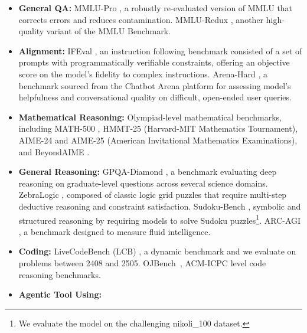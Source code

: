 \begin{itemize}
    \item\textbf{General QA: }MMLU-Pro \citep{wang2024mmluprorobustchallengingmultitask}, a robustly re-evaluated version of MMLU \citep{hendrycks2021measuringmassivemultitasklanguage} that corrects errors and reduces contamination. MMLU-Redux \citep{gema2025mmluredux}, another high-quality variant of the MMLU Benchmark. 
    \item\textbf{Alignment: }IFEval \citep{zhou2023ifeval}, an instruction following benchmark consisted of a set of prompts with programmatically verifiable constraints, offering an objective score on the model's fidelity to complex instructions. Arena-Hard \citep{arenahard2024}, a benchmark sourced from the Chatbot Arena platform for assessing model's helpfulness and conversational quality on difficult, open-ended user queries. 
    \item\textbf{Mathematical Reasoning: }Olympiad-level mathematical benchmarks, including MATH-500 \citep{math500}, HMMT-25\citep{HMMT25} (Harvard-MIT Mathematics Tournament), AIME-24 \citep{AIME24} and AIME-25 \citep{AIME25} (American Invitational Mathematics Examinations), and BeyondAIME \citep{bytedanceseed2025beyondaime}.
    \item\textbf{General Reasoning: }GPQA-Diamond \citep{rein2024gpqa}, a benchmark evaluating deep reasoning on graduate-level questions across several science domains. ZebraLogic \citep{lin2025zebralogic}, composed of classic logic grid puzzles that require multi-step deductive reasoning and constraint satisfaction. Sudoku-Bench \citep{seely2025sudoku-bench}, symbolic and structured reasoning by requiring models to solve Sudoku puzzles\footnote{We evaluate the model on the challenging nikoli\_100 dataset.}. ARC-AGI \citep{chollet2019github}, a benchmark designed to measure fluid intelligence.
    \item\textbf{Coding: }LiveCodeBench (LCB) \citep{jain2025livecodebench}, a dynamic benchmark and we evaluate on problems between 2408 and 2505. 
    OJBench~\citep{wang2025ojbenchcompetitionlevelcode}, ACM-ICPC level code reasoning benchmarks. 
    \item\textbf{Agentic Tool Using: } 

\end{itemize}
